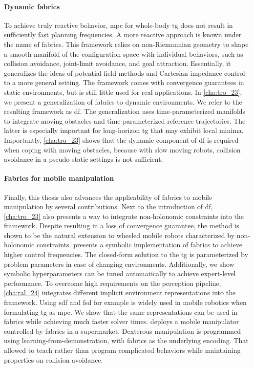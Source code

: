 \paragraph{Dynamic fabrics}
To achieve truly reactive behavior, \ac{mpc} for whole-body \ac{tg} does not
result in sufficiently fast planning frequencies. A more reactive approach is
known under the name of \ac{fabrics}. This framework relies on non-Riemannian
geometry to shape a smooth manifold of the configuration space with individual
behaviors, such as collision avoidance, joint-limit avoidance, and goal 
attraction. Essentially, it generalizes the ideas of potential field methods
and Cartesian impedance control to a more general setting. The framework comes
with convergence guarantees in static environments, but is still little used
for real applications. In \cref{cha:tro_23}, we present a generalization of
\ac{fabrics} to dynamic environments. We refer to the resulting framework as
\ac{df}. The generalization uses time\hyp{}parameterized manifolds to integrate 
moving obstacles and time\hyp{}parameterized reference trajectories. The latter is
especially important for long-horizon \ac{tg} that may exhibit local minima.
Importantly, \cref{cha:tro_23} shows that the dynamic component of \ac{df}
is required when coping with moving obstacles, because with slow moving robots,
collision avoidance in a pseudo-static settings is not sufficient.

\paragraph{Fabrics for mobile manipulation}
Finally, this thesis also advances the applicability of \ac{fabrics} to mobile
manipulation by several contributions. 
Next to the introduction of \ac{df}, \cref{cha:tro_23} also presents a way to
integrate non\hyp{}holonomic constraints into the framework. Despite resulting in a
loss of convergence guarantee, the method is shown to be the natural extension
to wheeled mobile robots characterized by non\hyp{}holonomic constraints.
 presents a symbolic
implementation of \ac{fabrics} to achieve higher control frequencies. The
closed-form solution to the \ac{tg} is parameterized by problem parameters in
case of changing environments. Additionally, we show symbolic 
hyperparameters can be tuned automatically to achieve expert-level performance.
To overcome high requirements on the perception pipeline, \cref{cha:ral_24}
integrates different implicit environment representations into the framework.
Using \acf{sdf} and \acf{fsd} for example is widely used in mobile robotics when
formulating \ac{tg} as \ac{mpc}. We show that the same representations can be
used in \ac{fabrics} while achieving much faster solver times.
 deploys a mobile manipulator controlled by \ac{fabrics}
in a supermarket. Dexterous manipulation is programmed using
learning-from-demonstration, with \ac{fabrics} as the underlying encoding.
That allowed to teach rather than program complicated behaviors while
maintaining properties on collision avoidance.

